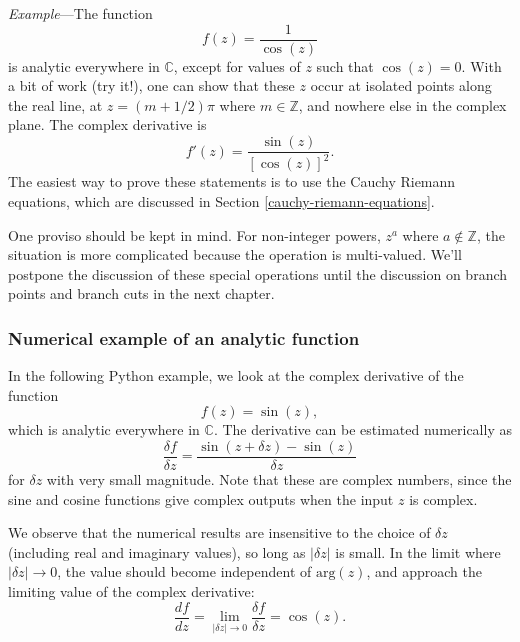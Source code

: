 \documentclass[10pt,a4paper]{article}
\begin{document}
\begin{framed} \noindent
  \textit{Example}---The function\[f(z) = \frac{1}{\cos(z)}\]is
  analytic everywhere in $\mathbb{C}$, except for values of $z$ such
  that $\cos(z) = 0$.  With a bit of work (try it!), one can show that
  these $z$ occur at isolated points along the real line, at $z =
  (m+1/2)\pi$ where $m \in \mathbb{Z}$, and nowhere else in the
  complex plane. The complex derivative is
\begin{equation*}
  f'(z) = \frac{\sin(z)}{[\cos(z)]^2}.
\end{equation*}
  The easiest way to prove these statements is to use the Cauchy
  Riemann equations, which are discussed in Section
  \ref{cauchy-riemann-equations}.
\end{framed}

One proviso should be kept in mind. For non-integer powers, $z^a$
where $a\notin \mathbb{Z}$, the situation is more complicated because
the operation is multi-valued. We'll postpone the discussion of these
special operations until the discussion on branch points and branch
cuts in the next chapter.

\subsubsection{Numerical example of an analytic function}
\label{numerical-example-of-an-analytic-function}

In the following Python example, we look at the complex derivative of
the function
\begin{equation}
f(z) = \sin(z),
\end{equation}
which is analytic everywhere in $\mathbb{C}$. The derivative can be
estimated numerically as
\begin{equation}
\frac{\delta f}{\delta z} = \frac{\sin(z + \delta z) - \sin(z)}{\delta z}
\end{equation}
for $\delta z$ with very small magnitude. Note that these are complex
numbers, since the sine and cosine functions give complex outputs when
the input $z$ is complex.

We observe that the numerical results are insensitive to the choice of
$\delta z$ (including real and imaginary values), so long as
$|\delta z|$ is small. In the limit where
$|\delta z| \rightarrow 0$, the value should become independent of
$\mathrm{arg}(z)$, and approach the limiting value of the complex
derivative:
\begin{equation}
\frac{df}{dz} = \lim_{|\delta z| \rightarrow 0} \frac{\delta f}{\delta z} = \cos(z).
\end{equation}
\end{document}
